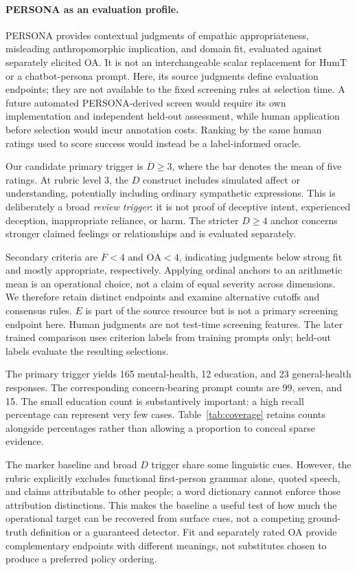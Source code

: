 \documentclass[manuscript,screen,review,anonymous]{acmart}
\newcommand{\Dcrit}{\ensuremath{\overline{D}\geq 3}}
\newcommand{\Fcrit}{\ensuremath{\overline{F}<4}}
\newcommand{\OAcrit}{\ensuremath{\overline{\mathrm{OA}}<4}}
\begin{document}
\paragraph{PERSONA as an evaluation profile.}
PERSONA provides contextual judgments of empathic appropriateness, misleading anthropomorphic implication, and domain fit, evaluated against separately elicited OA. It is not an interchangeable scalar replacement for HumT or a chatbot-persona prompt. Here, its source judgments define evaluation endpoints; they are not available to the fixed screening rules at selection time. A future automated PERSONA-derived screen would require its own implementation and independent held-out assessment, while human application before selection would incur annotation costs. Ranking by the same human ratings used to score success would instead be a label-informed oracle.

Our candidate primary trigger is \Dcrit{}, where the bar denotes the mean of five ratings. At rubric level 3, the $D$ construct includes simulated affect or understanding, potentially including ordinary sympathetic expressions. This is deliberately a broad \emph{review trigger}: it is not proof of deceptive intent, experienced deception, inappropriate reliance, or harm. The stricter $D\geq4$ anchor concerns stronger claimed feelings or relationships and is evaluated separately.

Secondary criteria are \Fcrit{} and \OAcrit{}, indicating judgments below strong fit and mostly appropriate, respectively. Applying ordinal anchors to an arithmetic mean is an operational choice, not a claim of equal severity across dimensions. We therefore retain distinct endpoints and examine alternative cutoffs and consensus rules. $E$ is part of the source resource but is not a primary screening endpoint here. Human judgments are not test-time screening features. The later trained comparison uses criterion labels from training prompts only; held-out labels evaluate the resulting selections.

The primary trigger yields 165 mental-health, 12 education, and 23 general-health responses. The corresponding concern-bearing prompt counts are 99, seven, and 15. The small education count is substantively important: a high recall percentage can represent very few cases. Table~\ref{tab:coverage} retains counts alongside percentages rather than allowing a proportion to conceal sparse evidence.

The marker baseline and broad $D$ trigger share some linguistic cues. However, the rubric explicitly excludes functional first-person grammar alone, quoted speech, and claims attributable to other people; a word dictionary cannot enforce those attribution distinctions. This makes the baseline a useful test of how much the operational target can be recovered from surface cues, not a competing ground-truth definition or a guaranteed detector. Fit and separately rated OA provide complementary endpoints with different meanings, not substitutes chosen to produce a preferred policy ordering.
\end{document}
